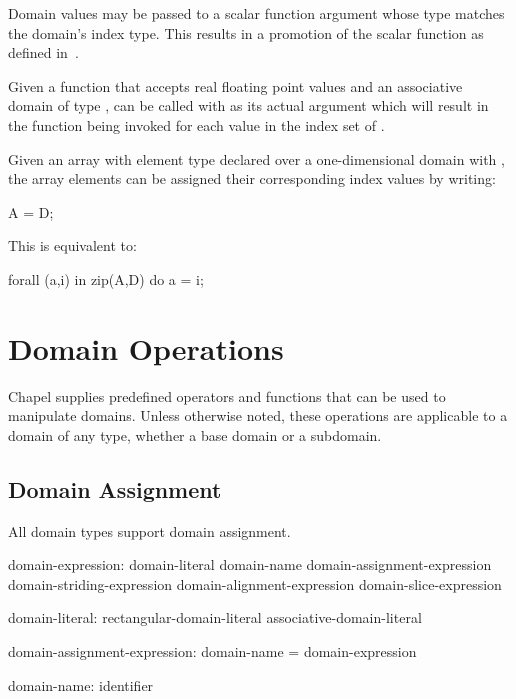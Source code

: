 Domain values may be passed to a scalar function argument whose type
matches the domain's index type.  This results in a promotion of the
scalar function as defined in~.

\begin{example}
Given a function  that accepts real floating point values
and an associative domain  of
type ,  can be called with  as
its actual argument which will result in the function being invoked
for each value in the index set of .
\end{example}

\begin{example}
Given an array  with element type  declared over a
one-dimensional domain  with  , the
array elements can be assigned their corresponding index values by
writing:
\begin{chapel}
A = D;
\end{chapel}
This is equivalent to:
\begin{chapel}
forall (a,i) in zip(A,D) do
  a = i;
\end{chapel}
\end{example}


\section{Domain Operations}

Chapel supplies predefined operators and functions that can be used to manipulate
domains.  Unless otherwise noted, these operations are applicable to a domain of
any type, whether a base domain or a subdomain.

\subsection{Domain Assignment}
\label{Domain_Assignment}

All domain types support domain assignment.  

\begin{syntax}
domain-expression:
  domain-literal
  domain-name
  domain-assignment-expression
  domain-striding-expression
  domain-alignment-expression
  domain-slice-expression

domain-literal:
  rectangular-domain-literal
  associative-domain-literal

domain-assignment-expression:
  domain-name = domain-expression

domain-name:
  identifier
\end{syntax}

